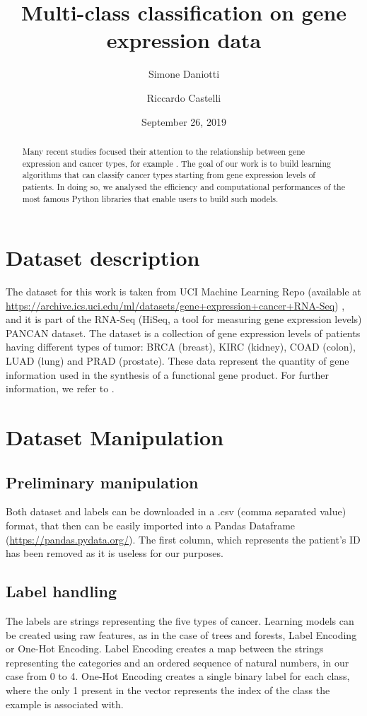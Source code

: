 \documentclass[12pt]{article}
\title{Multi-class classification on gene expression data}
\author[1]{Simone Daniotti}
\author[2]{Riccardo Castelli}
\affil[1]{Physics Department, University of Milan}
\affil[2]{Informatics Department, University of Milan}
\date{September 26, 2019}
\begin{document}
 \maketitle
  

\begin{abstract}
Many recent studies focused their attention to the relationship between gene expression and cancer types, for example \cite{wang2018gene}. The goal of our work is to build learning algorithms that can classify cancer types starting from gene expression levels of patients. In doing so, we analysed the efficiency and computational performances of the most famous Python libraries that enable users to build such models.
\end{abstract}


\newpage
\tableofcontents

\newpage
\section{Dataset description}

The dataset for this work is taken from UCI Machine Learning Repo (available at \url{https://archive.ics.uci.edu/ml/datasets/gene+expression+cancer+RNA-Seq}) \cite{Dua:2019}, and it is part of the RNA-Seq (HiSeq, a tool for measuring gene expression levels) PANCAN dataset. The dataset is a collection of gene expression levels of patients having different types of tumor: BRCA (breast), KIRC (kidney), COAD (colon), LUAD (lung) and PRAD (prostate).
These data represent the quantity of gene information used in the synthesis of a functional gene product. 
For further information, we refer to \cite{weinstein2013cancer}.


\section{Dataset Manipulation}


\subsection{Preliminary manipulation}
Both dataset and labels can be downloaded in a .csv (comma separated value) format, that then can be easily imported into a Pandas Dataframe (\url{https://pandas.pydata.org/}). The first column, which represents the patient's ID has been removed as it is useless for our purposes.


\subsection{Label handling}
The labels are strings representing the five types of cancer. Learning models can be created using raw features, as in the case of trees and forests, Label Encoding or One-Hot Encoding.
Label Encoding creates a map between the strings representing the categories and an ordered sequence of natural numbers, in our case from 0 to 4.
One-Hot Encoding creates a single binary label for each class, where the only 1 present in the vector represents the index of the class the example is associated with.  
\end{document}
